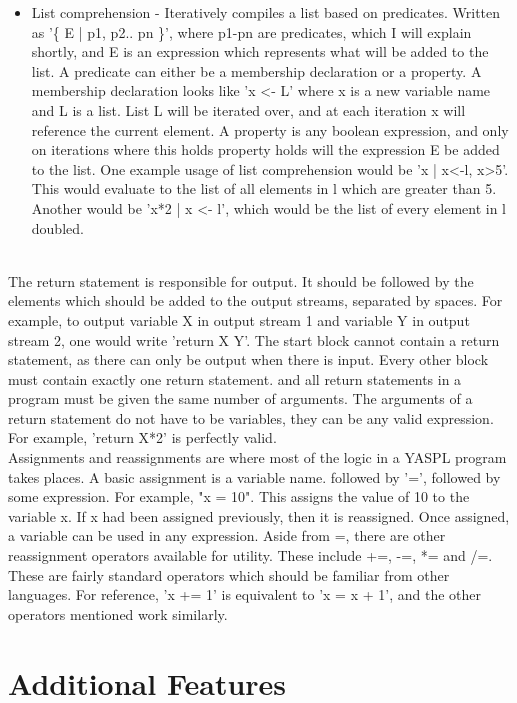 \documentclass{article}
\begin{document}
\begin{itemize}
    \item List comprehension - Iteratively compiles a list based on predicates. Written as '\{ E | p1, p2.. pn \}', where p1-pn are predicates, which I will explain shortly, and E is an expression which represents what will be added to the list. A predicate can either be a membership declaration or a property. A membership declaration looks like 'x <- L' where x is a new variable name and L is a list. List L will be iterated over, and at each iteration x will reference the current element. A property is any boolean expression, and only on iterations where this holds property holds will the expression E be added to the list. One example usage of list comprehension would be '{x | x<-l, x>5}'. This would evaluate to the list of all elements in l which are greater than 5. Another would be '{x*2 | x <- l}', which would be the list of every element in l doubled.
\end{itemize}
\\
The return statement is responsible for output. It should be followed by the elements which should be added to the output streams, separated by spaces. For example, to output variable X in output stream 1 and variable Y in output stream 2, one would write 'return X Y'. The start block cannot contain a return statement, as there can only be output when there is input. Every other block must contain exactly one return statement. and all return statements in a program must be given the same number of arguments. The arguments of a return statement do not have to be variables, they can be any valid expression. For example, 'return X*2' is perfectly valid.
\\
Assignments and reassignments are where most of the logic in a YASPL program takes places. A basic assignment is a variable name. followed by '=', followed by some expression. For example, "x = 10". This assigns the value of 10 to the variable x. If x had been assigned previously, then it is reassigned. Once assigned, a variable can be used in any expression. Aside from =, there are other reassignment operators available for utility. These include +=, -=, *= and /=. These are fairly standard operators which should be familiar from other languages. For reference, 'x += 1' is equivalent to 'x = x + 1', and the other operators mentioned work similarly. 

\section{Additional Features}
\end{document}
